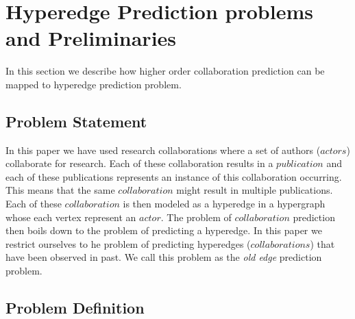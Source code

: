 \documentclass{sig-alternate}
\begin{document}


\section{Hyperedge Prediction problems and Preliminaries}

In this section we describe how higher order collaboration prediction can be mapped to hyperedge prediction problem. 

\subsection{Problem Statement}

In this paper we have used research collaborations where a set of authors ($actors$) collaborate for research. Each of these collaboration results in a $publication$ and each of these publications represents an instance of this collaboration occurring. This means that the same $collaboration$ might result in multiple publications. Each of these $collaboration$ is then modeled as a hyperedge in a hypergraph whose each vertex represent an $actor$. The problem of $collaboration$ prediction then boils down to the problem of predicting a hyperedge. In this paper we restrict ourselves to he problem of predicting hyperedges ($collaborations$) that have been observed in past. We call this problem as the \textit{old edge} prediction problem. 



\subsection{Problem Definition}
\end{document}
